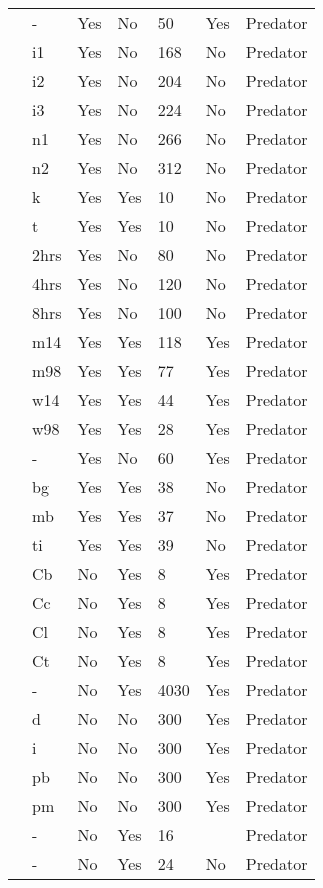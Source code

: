 \begin{table}[!tbp]
\begin{center}
\begin{tabular}{lllllll}
\citet{Salt:1974aa}&-&Yes&No&50&Yes&Predator\tabularnewline
\citet{Uttley:1980aa}&i1&Yes&No&168&No&Predator\tabularnewline
\citet{Uttley:1980aa}&i2&Yes&No&204&No&Predator\tabularnewline
\citet{Uttley:1980aa}&i3&Yes&No&224&No&Predator\tabularnewline
\citet{Uttley:1980aa}&n1&Yes&No&266&No&Predator\tabularnewline
\citet{Uttley:1980aa}&n2&Yes&No&312&No&Predator\tabularnewline
\citet{Vahl:2005aa}&k&Yes&Yes&10&No&Predator\tabularnewline
\citet{Vahl:2005aa}&t&Yes&Yes&10&No&Predator\tabularnewline
\citet{Von-Westernhagen:1976aa}&2hrs&Yes&No&80&No&Predator\tabularnewline
\citet{Von-Westernhagen:1976aa}&4hrs&Yes&No&120&No&Predator\tabularnewline
\citet{Von-Westernhagen:1976aa}&8hrs&Yes&No&100&No&Predator\tabularnewline
\citet{Vucetich:2002aa}&m14&Yes&Yes&118&Yes&Predator\tabularnewline
\citet{Vucetich:2002aa}&m98&Yes&Yes&77&Yes&Predator\tabularnewline
\citet{Vucetich:2002aa}&w14&Yes&Yes&44&Yes&Predator\tabularnewline
\citet{Vucetich:2002aa}&w98&Yes&Yes&28&Yes&Predator\tabularnewline
\citet{Walde:1984aa}&-&Yes&No&60&Yes&Predator\tabularnewline
\citet{Wasserman:2016aa}&bg&Yes&Yes&38&No&Predator\tabularnewline
\citet{Wasserman:2016aa}&mb&Yes&Yes&37&No&Predator\tabularnewline
\citet{Wasserman:2016aa}&ti&Yes&Yes&39&No&Predator\tabularnewline
\citet{Blowes:2017aa}&Cb&No&Yes&8&Yes&Predator\tabularnewline
\citet{Blowes:2017aa}&Cc&No&Yes&8&Yes&Predator\tabularnewline
\citet{Blowes:2017aa}&Cl&No&Yes&8&Yes&Predator\tabularnewline
\citet{Blowes:2017aa}&Ct&No&Yes&8&Yes&Predator\tabularnewline
\citet{Cresswell:1998aa}&-&No&Yes&4030&Yes&Predator\tabularnewline
\citet{Elliott:2003aa}&d&No&No&300&Yes&Predator\tabularnewline
\citet{Elliott:2003aa}&i&No&No&300&Yes&Predator\tabularnewline
\citet{Elliott:2003aa}&pb&No&No&300&Yes&Predator\tabularnewline
\citet{Elliott:2003aa}&pm&No&No&300&Yes&Predator\tabularnewline
\citet{Hebblewhite:2013aa}&-&No&Yes&16&&Predator\tabularnewline
\citet{Stier:2013aa}&-&No&Yes&24&No&Predator\tabularnewline
\hline
\end{tabular}\end{center}
\end{table}
